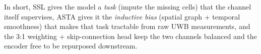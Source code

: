 In short, SSL gives the model a \emph{task} (impute the missing
cells) that the channel itself supervises, ASTA gives it the
\emph{inductive bias} (spatial graph + temporal smoothness) that
makes that task tractable from raw UWB measurements, and the 3:1
weighting + skip-connection head keep the two channels balanced
and the encoder free to be repurposed downstream.
